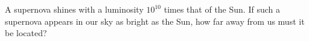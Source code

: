 A supernova shines with a luminosity $10^{10}$ times that of the Sun. If
such a supernova appears in our sky as bright as the Sun, how far away from
us must it be located?
